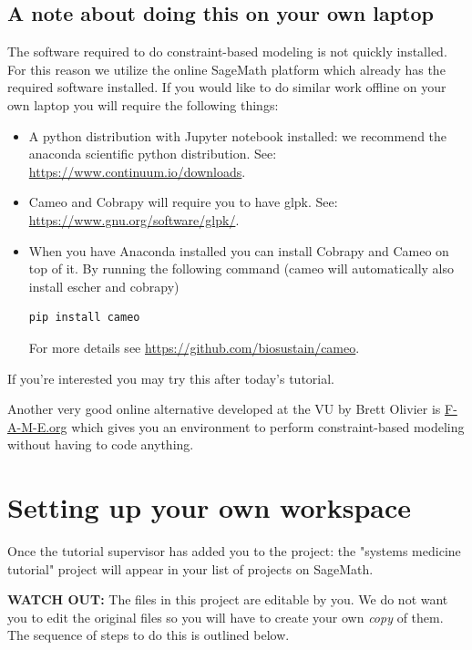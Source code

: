 \documentclass{article}
\begin{document}
\subsection*{A note about doing this on your own laptop}
The software required to do constraint-based modeling is not quickly installed. For this reason we utilize the online SageMath platform which already has the required software installed.
If you would like to do similar work offline on your own laptop you will require the following things:
\begin{itemize}
\item A python distribution with Jupyter notebook installed: we recommend the anaconda scientific python distribution. See: \url{https://www.continuum.io/downloads}.
\item Cameo and Cobrapy will require you to have glpk. See: \url{https://www.gnu.org/software/glpk/}.
\item When you have Anaconda installed you can install Cobrapy and Cameo on top of it. By running the following command (cameo will automatically also install escher and cobrapy)
\begin{verbatim}
pip install cameo
\end{verbatim}

For more details see \url{https://github.com/biosustain/cameo}.

\end{itemize}

If you're interested you may try this after today's tutorial. 

Another very good online alternative developed at the VU by Brett Olivier is \url{F-A-M-E.org} which gives you an environment to perform constraint-based modeling without having to code anything.

\section*{Setting up your own workspace}

Once the tutorial supervisor has added you to the project: the "systems me\-di\-cine tutorial" project will appear in your list of projects on SageMath.

\textbf{WATCH OUT:} The files in this project are editable by you. We do not want you to edit the original files so you will have to create your own \emph{copy} of them. The sequence of steps to do this is outlined below.
\end{document}
